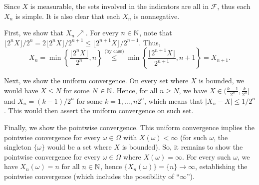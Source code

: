 \begin{enumerate}
\begin{pf}
Since \(X\) is measurable, the sets involved in the indicators are all in
\(\mathcal{F}\), thus each \(X_n\) is simple. It is also clear that each
\(X_n\) is nonnegative.

First, we show that \(X_n\nearrow\).
For every \(n\in\mathbb{N}\), note that \(\lfloor 2^nX\rfloor/2^n=
2\lfloor 2^nX\rfloor/2^{n+1}\le \lfloor 2^{n+1}X\rfloor/2^{n+1}\). Thus,
\[
X_n=\min\left\{\frac{\lfloor 2^nX\rfloor}{2^n},n\right\}
\overset{\text{(by case)}}{\le}\min\left\{\frac{\lfloor 2^{n+1}X\rfloor}{2^{n+1}},n+1\right\}
=X_{n+1}.
\]

Next, we show the uniform convergence.  On every set where \(X\) is bounded, we
would have \(X\le N\) for some \(N\in\mathbb{N}\). Hence, for all \(n\ge N\), we have
\(X\in (\frac{k-1}{2^{n}},\frac{k}{2^{n}}]\) and \(X_n=(k-1)/2^{n}\) for some
\(k=1,\dotsc,n2^{n}\), which means that \(|X_n-X|\le 1/2^{n}\). This would then
assert the uniform convergence on such set.

Finally, we show the pointwise convergence. This uniform convergence implies
the pointwise convergence for every \(\omega\in\Omega\) with
\(X(\omega)<\infty\) (for such \(\omega\), the singleton \(\{\omega\}\) would
be a set where \(X\) is bounded). So, it remains to show the pointwise
convergence for every \(\omega\in\Omega\) where \(X(\omega)=\infty\). For every
such \(\omega\), we have \(X_n(\omega)=n\) for all \(n\in\mathbb{N}\), hence
\(\{X_n(\omega)\}=\{n\}\to\infty\), establishing the pointwise convergence
(which includes the possibility of ``\(\infty\)'').
\end{pf}


\end{enumerate}
